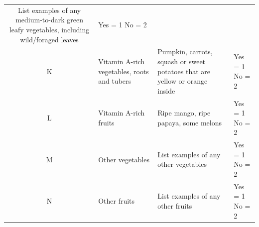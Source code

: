 \documentclass[12pt,]{book}
\theoremstyle{definition}
\theoremstyle{definition}
\theoremstyle{definition}
\theoremstyle{remark}
\begin{document}
\begin{longtable}[]{@{}clll@{}}
\begin{minipage}[t]{0.54\columnwidth}
List examples of any medium-to-dark green leafy vegetables, including
wild/foraged leaves\strut
\end{minipage} & \begin{minipage}[t]{0.12\columnwidth}\raggedright
Yes = 1 No = 2\strut
\end{minipage}\tabularnewline
\begin{minipage}[t]{0.05\columnwidth}\centering
K\strut
\end{minipage} & \begin{minipage}[t]{0.18\columnwidth}\raggedright
Vitamin A-rich vegetables, roots and tubers\strut
\end{minipage} & \begin{minipage}[t]{0.54\columnwidth}\raggedright
Pumpkin, carrots, squash or sweet potatoes that are yellow or orange
inside\strut
\end{minipage} & \begin{minipage}[t]{0.12\columnwidth}\raggedright
Yes = 1 No = 2\strut
\end{minipage}\tabularnewline
\begin{minipage}[t]{0.05\columnwidth}\centering
L\strut
\end{minipage} & \begin{minipage}[t]{0.18\columnwidth}\raggedright
Vitamin A-rich fruits\strut
\end{minipage} & \begin{minipage}[t]{0.54\columnwidth}\raggedright
Ripe mango, ripe papaya, some melons\strut
\end{minipage} & \begin{minipage}[t]{0.12\columnwidth}\raggedright
Yes = 1 No = 2\strut
\end{minipage}\tabularnewline
\begin{minipage}[t]{0.05\columnwidth}\centering
M\strut
\end{minipage} & \begin{minipage}[t]{0.18\columnwidth}\raggedright
Other vegetables\strut
\end{minipage} & \begin{minipage}[t]{0.54\columnwidth}\raggedright
List examples of any other vegetables\strut
\end{minipage} & \begin{minipage}[t]{0.12\columnwidth}\raggedright
Yes = 1 No = 2\strut
\end{minipage}\tabularnewline
\begin{minipage}[t]{0.05\columnwidth}\centering
N\strut
\end{minipage} & \begin{minipage}[t]{0.18\columnwidth}\raggedright
Other fruits\strut
\end{minipage} & \begin{minipage}[t]{0.54\columnwidth}\raggedright
List examples of any other fruits\strut
\end{minipage} & \begin{minipage}[t]{0.12\columnwidth}\raggedright
Yes = 1 No = 2\strut
\end{minipage}\tabularnewline
\bottomrule
\end{longtable}
\end{document}
